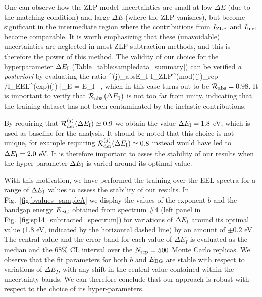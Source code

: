One can observe how the ZLP model uncertainties are small at low $\Delta E$
(due to the matching condition) and large $\Delta E$ (where the ZLP vanishes),
but become significant in the intermediate region where the contributions
from $I_{\rm ZLP}$ and $I_{\rm inel}$ become comparable.
%
It is worth emphasizing that these (unavoidable) uncertainties are neglected in most
ZLP subtraction methods, and this is therefore the power of this method.
%
The validity of our choice for the hyperparameter $\Delta E_{\rm I}$ (Table~\ref{table:sampledata_summary})
can be verified {\it a posteriori} by evaluating the ratio
\be
{}^{(j)}_{\rm abs}\lp \Delta E_{\rm I}\rp \equiv 
\la I_{\rm ZLP}^{({\rm mod})(j)}\ra_{\rm rep} \Big/I_{\rm EEL}^{({\rm exp})(j)} \Big|_{\Delta E = \Delta E_{\rm I}} \, ,
\ee
which in this case turns out to be $\mathcal{R}_{\rm abs} = 0.98$.
%
It is important to verify that $\mathcal{R}_{\rm abs}\left( \Delta E_1\right)$ is not too far from unity,
indicating that the training dataset has not been contaminated by the inelastic contributions.

By requiring that $\mathcal{R}^{(j)}_{\rm der}(\Delta E_{\rm I})\simeq 0.9$ we obtain
the value $\Delta E_{\rm I}=1.8$ eV, which is used as baseline for the analysis.
%
It should be noted that this choice is not unique, for example requiring
$\mathcal{R}^{(j)}_{\rm der}(\Delta E_{\rm I})\simeq 0.8$ instead would have led
to $\Delta E_{\rm I}=2.0$ eV.
%
It is therefore important to asses the stability of our results when the hyper-parameter $\Delta E_{\rm I}$
is varied around its optimal value.

With this motivation, we have performed the training over the EEL spectra 
for a range of $\Delta E_{\rm I}$ values to assess the stability of our
results.
%
In Fig.~\ref{fig:bvalues_sampleA} we display the
values of the exponent $b$
and the bandgap energy $E_{\rm BG}$ 
obtained from spectrum \#4 (left panel in Fig.~\ref{fig:sp14_subtracted_spectrum})
for variations of $\Delta E_{\rm I}$ around its optimal value
(1.8 eV, indicated by the horizontal dashed line) by an amount
of $\pm 0.2$ eV.
%
The central value and the error band for each value of $\Delta E_I$ is evaluated
as the median and the 68\% CL interval over the $N_{\rm rep}=500$ Monte Carlo replicas.
%
We observe that the fit parameters for both $b$ and $E_{\rm BG}$ are stable with respect
to variations of $\Delta E_I$, with any shift in the central value contained within the
uncertainty bands.
%
We can therefore conclude that our approach is robust with respect to the choice of its
hyper-parameters.


